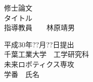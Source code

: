 \begin{titlepage}
\begin{center}

{\huge 修士論文}\\
\vspace{80truept}
{\huge タイトル}\\
\vspace{80truept}
{\huge 指導教員　　林原靖男}\\
\vspace{50truept}

{\huge 平成30年??月??日提出}\\
\vspace{30truept}
{\huge 千葉工業大学　工学研究科　\\ 未来ロボティクス専攻}\\
\vspace{30truept}
{\huge 学番　氏名}\\
\vspace{50truept}

\end{center}
\end{titlepage}
